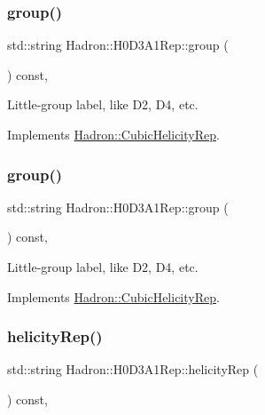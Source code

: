 \subsubsection{\texorpdfstring{group()}{group()}\hspace{0.1cm}{\footnotesize\ttfamily [2/3]}}
{\footnotesize\ttfamily std\+::string Hadron\+::\+H0\+D3\+A1\+Rep\+::group (\begin{DoxyParamCaption}{ }\end{DoxyParamCaption}) const\hspace{0.3cm}{\ttfamily [inline]}, {\ttfamily [virtual]}}

Little-\/group label, like D2, D4, etc. 

Implements \mbox{\hyperlink{structHadron_1_1CubicHelicityRep_a101a7d76cd8ccdad0f272db44b766113}{Hadron\+::\+Cubic\+Helicity\+Rep}}.

\mbox{\label{structHadron_1_1H0D3A1Rep_acb3ae7caf69d50372d06639f12c8c72c}} 
\subsubsection{\texorpdfstring{group()}{group()}\hspace{0.1cm}{\footnotesize\ttfamily [3/3]}}
{\footnotesize\ttfamily std\+::string Hadron\+::\+H0\+D3\+A1\+Rep\+::group (\begin{DoxyParamCaption}{ }\end{DoxyParamCaption}) const\hspace{0.3cm}{\ttfamily [inline]}, {\ttfamily [virtual]}}

Little-\/group label, like D2, D4, etc. 

Implements \mbox{\hyperlink{structHadron_1_1CubicHelicityRep_a101a7d76cd8ccdad0f272db44b766113}{Hadron\+::\+Cubic\+Helicity\+Rep}}.

\mbox{\label{structHadron_1_1H0D3A1Rep_a6a15df8ab6ee2e04b693258ef6cd02ef}} 
\subsubsection{\texorpdfstring{helicityRep()}{helicityRep()}\hspace{0.1cm}{\footnotesize\ttfamily [1/2]}}
{\footnotesize\ttfamily std\+::string Hadron\+::\+H0\+D3\+A1\+Rep\+::helicity\+Rep (\begin{DoxyParamCaption}{ }\end{DoxyParamCaption}) const\hspace{0.3cm}{\ttfamily [inline]}, {\ttfamily [virtual]}}


